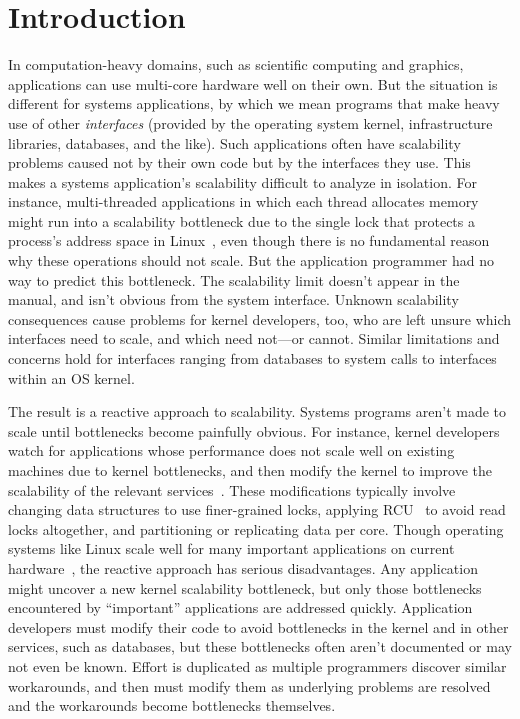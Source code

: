 \section{Introduction}
\label{sec:intro}

In computation-heavy domains, such as scientific computing and
graphics, applications can use multi-core hardware well on their own.
%
But the situation is different for systems applications, by which we
mean programs that make heavy use of other \emph{interfaces} (provided
by the operating system kernel, infrastructure libraries, databases, and
the like).
%
Such applications often have scalability problems caused not
by their own code but by the interfaces they use.
%
This makes a systems application's scalability difficult to analyze in
isolation.
%
For instance, multi-threaded applications
in which each thread allocates memory
might run into a scalability bottleneck due to the single lock that protects
a process's address space in Linux~\cite{clements:bonsai}, even though there
is no fundamental reason why these operations should not scale.
%
But the application programmer had no way to predict this bottleneck.
%
The scalability limit doesn't appear in the manual, and isn't obvious
from the system interface.
%
Unknown scalability consequences cause problems for kernel developers, too,
who are left unsure which interfaces need to scale, and which need
not---or cannot.
%
Similar limitations and concerns hold for interfaces ranging from
databases to system calls to interfaces within an OS kernel.

The result is a reactive approach to scalability.
%
Systems programs aren't made to scale until bottlenecks become
painfully obvious.
%
For instance, kernel developers watch for applications
whose performance does not scale well on existing machines due to kernel
bottlenecks, and then modify the kernel to improve the scalability of the
relevant services~\cite{cacm-real-world}.  These modifications typically
involve changing data structures to use finer-grained locks, applying
RCU~\cite{rcu:linux} to avoid read locks altogether, and partitioning or
replicating data per core.
%
Though operating systems like Linux scale well for many important applications on current
hardware~\cite{boyd-wickizer:scaling},
%
the reactive approach has serious disadvantages.
%
Any application might uncover a new kernel scalability bottleneck,
but only those bottlenecks encountered by ``important'' applications
are addressed quickly.
%
Application developers must modify their code to avoid bottlenecks in
the kernel and in other services, such as databases, but these
bottlenecks often aren't documented or may not even be known.
%
Effort is duplicated as multiple programmers discover similar
workarounds, and then must modify them as underlying problems are
resolved and the workarounds become bottlenecks themselves.

